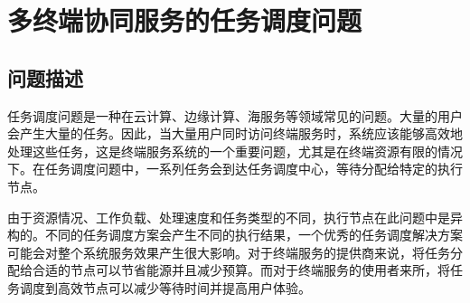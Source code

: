 \section{多终端协同服务的任务调度问题}\label{sec:task_scheduling_problems}
\subsection{问题描述}

任务调度问题是一种在云计算\cite{qiao2016efficient}、边缘计算\cite{guo2017energy}、海服务\cite{王劲林2015一种现场}等领域常见的问题。大量的用户会产生大量的任务。因此，当大量用户同时访问终端服务时，系统应该能够高效地处理这些任务，这是终端服务系统的一个重要问题，尤其是在终端资源有限的情况下。在任务调度问题中，一系列任务会到达任务调度中心，等待分配给特定的执行节点。

由于资源情况、工作负载、处理速度和任务类型的不同，执行节点在此问题中是异构的。不同的任务调度方案会产生不同的执行结果，一个优秀的任务调度解决方案可能会对整个系统服务效果产生很大影响。对于终端服务的提供商来说，将任务分配给合适的节点可以节省能源并且减少预算。而对于终端服务的使用者来所，将任务调度到高效节点可以减少等待时间并提高用户体验。

